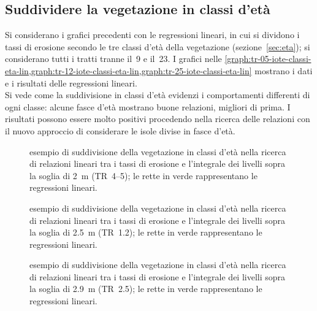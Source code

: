 \subsection{Suddividere la vegetazione in classi d'età}
Si considerano i grafici precedenti con le regressioni lineari, in cui si dividono i tassi di erosione secondo le tre classi d'età della vegetazione (sezione~\ref{sec:eta}); si considerano tutti i tratti tranne il~9 e il~23.
I grafici nelle \cref{graph:tr-05-iote-classi-eta-lin,graph:tr-12-iote-classi-eta-lin,graph:tr-25-iote-classi-eta-lin} mostrano i dati e i risultati delle regressioni lineari.
\\
Si vede come la suddivisione in classi d'età evidenzi i comportamenti differenti di ogni classe: alcune fasce d'età mostrano buone relazioni, migliori di prima.
I risultati possono essere molto positivi procedendo nella ricerca delle relazioni con il nuovo approccio di considerare le isole divise in fasce d'età.
%
\begin{figure}
	\centering
	
	\caption[ricerca di relazioni lineari tra erosione suddivisa in classi d'età e piene con livello maggiore di \SI{2}{\m}]{esempio di suddivisione della vegetazione in classi d'età nella ricerca di relazioni lineari tra i tassi di erosione e l'integrale dei livelli sopra la soglia di \SI{2}{\m} (TR~\SIrange[range-phrase = {-}, range-units = single]{4}{5}{\mesi}); le rette in verde rappresentano le regressioni lineari.}
	\label{graph:tr-05-iote-classi-eta-lin}
\end{figure}
%
%
\begin{figure}
	\centering
	
	\caption[ricerca di relazioni lineari tra erosione suddivisa in classi d'età e piene con livello maggiore di \SI{2.5}{\m}]{esempio di suddivisione della vegetazione in classi d'età nella ricerca di relazioni lineari tra i tassi di erosione e l'integrale dei livelli sopra la soglia di \SI{2.5}{\m} (TR~\SI{1.2}{\anni}); le rette in verde rappresentano le regressioni lineari.}
	\label{graph:tr-12-iote-classi-eta-lin}
\end{figure}
%
%
\begin{figure}
	\centering
	
	\caption[ricerca di relazioni lineari tra erosione suddivisa in classi d'età e piene con livello maggiore di \SI{2.9}{\m}]{esempio di suddivisione della vegetazione in classi d'età nella ricerca di relazioni lineari tra i tassi di erosione e l'integrale dei livelli sopra la soglia di \SI{2.9}{\m} (TR~\SI{2.5}{\anni}); le rette in verde rappresentano le regressioni lineari.}
	\label{graph:tr-25-iote-classi-eta-lin}
\end{figure}
%




